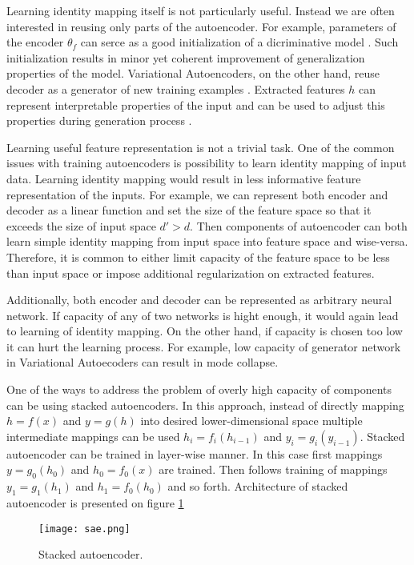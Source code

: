 Learning identity mapping itself is not particularly useful.
Instead we are often interested in reusing only parts of the autoencoder.
For example, parameters of the encoder $\theta_f$ can serce as a good initialization of a dicriminative model \cite{Masci2011, Vincent2010, Zhao2015}.
Such initialization results in minor yet coherent improvement of generalization properties of the model.
Variational Autoencoders, on the other hand, reuse decoder as a generator of new training examples \cite{Kingma2013}.
Extracted features $h$ can represent interpretable properties of the input and can be used to adjust this
properties during generation process \cite{Kulkarni2015, Whitney2016}.

Learning useful feature representation is not a trivial task.
One of the common issues with training autoencoders is possibility to learn identity mapping of input data.
Learning identity mapping would result in less informative feature representation of the inputs.
For example, we can represent both encoder and decoder as a linear function and set the size of the feature space so that it exceeds the size of input space $d' > d$.
Then components of autoencoder can both learn simple identity mapping from input space into feature space and wise-versa.
Therefore, it is common to either limit capacity of the feature space to be less than input space or impose additional regularization on extracted features.

Additionally, both encoder and decoder can be represented as arbitrary neural network.
If capacity of any of two networks is hight enough, it would again lead to learning of identity mapping.
On the other hand, if capacity is chosen too low it can hurt the learning process.
For example, low capacity of generator network in Variational Autoecoders can result in mode collapse.

One of the ways to address the problem of overly high capacity of components can be using stacked autoencoders.
In this approach, instead of directly mapping $h=f(x)$ and $y=g(h)$ into desired lower-dimensional space multiple intermediate mappings can be used $h_i=f_i(h_{i-1})$ and $y_i=g_i(y_{i-1})$.
Stacked autoencoder can be trained in layer-wise manner.
In this case first mappings $y=g_0(h_0)$ and $h_0=f_0(x)$ are trained.
Then follows training of mappings $y_1=g_1(h_1)$ and $h_1=f_0(h_0)$ and so forth.
Architecture of stacked autoencoder is presented on figure \ref{fig:sae}

\begin{figure}[h!]
  \centering
    \texttt{[image: sae.png]}
  \caption{Stacked autoencoder.}
  \label{fig:sae}
\end{figure}

